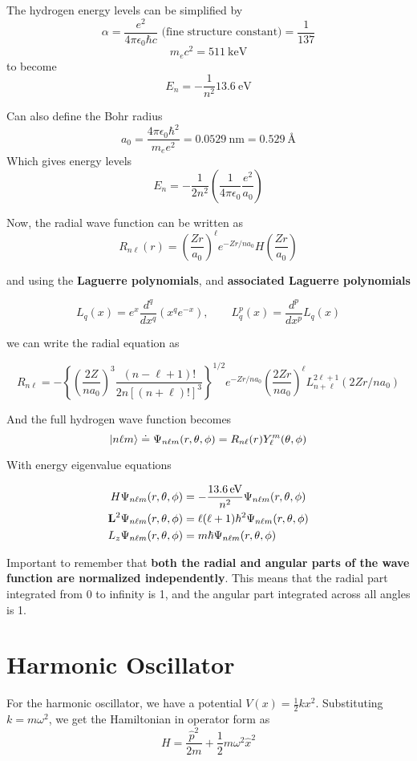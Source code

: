 \documentclass{article}
\begin{document}
The hydrogen energy levels can be simplified by 
$$
\alpha = \frac{e^2}{4\pi \epsilon_0 \hbar c} \text{ (fine structure constant)} = \frac{1}{137}
$$
$$
m_e c^2 = \SI{511}{\kilo \eV}
$$
to become 
$$
E_n = -\frac{1}{n^2} \SI{13.6}{\eV}
$$

Can also define the Bohr radius
$$
a_0 = \frac{4\pi \epsilon_0 \hbar^2}{m_e e^2} = \SI{0.0529}{\nano \m} = \SI{0.529}{\angstrom}
$$
Which gives energy levels
$$
E_n = -\frac{1}{2n^2}\left( \frac{1}{4\pi\epsilon_0} \frac{e^2}{a_0} \right)
$$

Now, the radial wave function can be written as
$$
R_{n\ell}(r) = \left( \frac{Zr}{a_0}\right)^{\ell} e^{-Zr / n a_0}H\left( \frac{Zr}{a_0}\right)
$$

and using the \textbf{Laguerre polynomials}, and \textbf{associated Laguerre polynomials}

$$
L_q(x) = e^x \frac{d^q}{dx^q} (x^q e^{-x}), \qquad L^{p}_q(x) = \frac{d^p}{dx^p}L_q(x)
$$

we can write the radial equation as

$$
R_{n\ell} = - \left\{ \left( \frac{2Z}{na_0} \right)^3 \frac{(n-\ell + 1)!}{2n [(n+\ell)!]^3} \right\}^{1/2} e^{-Zr/na_0} \left( \frac{2Zr}{na_0} \right)^\ell L_{n+\ell}^{2\ell+1}(2Zr/na_0)
$$

And the full hydrogen wave function becomes
$$
\ket{n\ell m} \doteq \Psi_{n\ell m}(r,\theta,\phi) = R_{n\ell}(r)Y^m_\ell(\theta,\phi)
$$

With energy eigenvalue equations
\begin{center}
    \begin{align*}
        H\Psi_{n\ell m}(r,\theta,\phi) & = -\frac{\SI{13.6}{\eV}}{n^2}\Psi_{n\ell m}(r,\theta,\phi) \\
        \vb{L}^2 \Psi_{n\ell m}(r,\theta,\phi) & = \ell(\ell+1)\hbar^2 \Psi_{n\ell m}(r,\theta,\phi) \\
        L_z\Psi_{n\ell m}(r,\theta,\phi) & = m \hbar\Psi_{n\ell m}(r,\theta,\phi)
    \end{align*}
\end{center}

Important to remember that \textbf{both the radial and angular parts of the wave function are normalized independently}.  This means that the radial part integrated from 0 to infinity is 1, and the angular part integrated across all angles is 1.


\section{Harmonic Oscillator}
For the harmonic oscillator, we have a potential $V(x) = \frac{1}{2} kx^2$.  Substituting $k = m \omega^2$, we get the Hamiltonian in operator form as
$$
H = \frac{\hat{p}^2}{2m} + \frac{1}{2}m\omega^2 \hat{x}^2
$$
\end{document}
